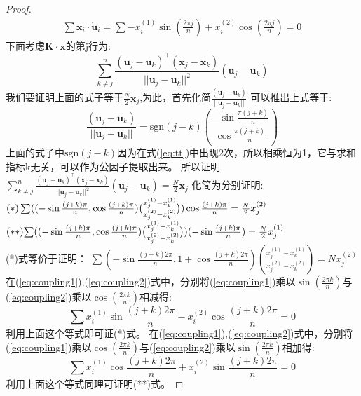 \begin{proof}
\begin{eqnarray}
\sum \bm{x}_i \cdot \mathring{\bm{u}}_i=\sum -x_i^{(1)} \sin(\frac{2\pi j}{n})+x_i^{(2)} \cos(\frac{2\pi j}{n}) =0\label{eq:coupling2}
\end{eqnarray}
下面考虑$\bm{K}\cdot \bm{x}$的第j行为:
\begin{equation}\label{eq:tt}
\sum_{k\neq j}^n \frac{(\bm{u}_j-\bm{u}_k)^\intercal (\bm{x}_j-\bm{x}_k)}{||\bm{u}_j-\bm{u}_k||^2}(\bm{u}_j-\bm{u}_k)
\end{equation}
我们要证明上面的式子等于$\frac{N}{2}\bm{x}_j$,为此，首先化简$\frac{(\bm{u}_j-\bm{u}_k)}{||\bm{u}_j-\bm{u}_k||}$
可以推出上式等于:
\begin{equation}
\frac{(\bm{u}_j-\bm{u}_k)}{||\bm{u}_j-\bm{u}_k||}=\text{sgn}(j-k)\binom{-\sin\frac{\pi(j+k)}{n}}{\cos\frac{\pi(j+k)}{n}}
\end{equation}
上面的式子中$\text{sgn}(j-k)$因为在式(\ref{eq:tt})中出现2次，所以相乘恒为1，它与求和指标k无关，可以作为公因子提取出来。
所以证明
$\sum_{k\neq j}^n \frac{(\bm{u}_j-\bm{u}_k)^\intercal (\bm{x}_j-\bm{x}_k)}{||\bm{u}_j-\bm{u}_k||^2}(\bm{u}_j-\bm{u}_k)=\frac{N}{2}\bm{x}_j
$
化简为分别证明:
$\scriptsize{
(*)\sum ((-\sin\frac{(j+k)\pi}{n},\cos\frac{(j+k)\pi}{n})\binom{x_j^{(1)}-x_k^{(1)}}{x_j^{(2)}-x_k^{(2)}})
\cos\frac{(j+k)\pi}{n}=\frac{N}{2}x_j^{(2)}}$
$(**)\scriptsize{\sum ((-\sin\frac{(j+k)\pi}{n},\cos\frac{(j+k)\pi}{n})\binom{x_j^{(1)}-x_k^{(1)}}{x_j^{(2)}-x_k^{(2)}})
(-\sin\frac{(j+k)\pi}{n})=\frac{N}{2}x_j^{(1)}}$\\
(*)式等价于证明：
$\sum (-\sin\frac{(j+k)2\pi}{n},1+\cos\frac{(j+k)2\pi}{n})\binom{x_j^{(1)}-x_k^{(1)}}{x_j^{(2)}-x_k^{(2)}}=Nx_j^{(2)}
$
在(\ref{eq:coupling1}),(\ref{eq:coupling2})式中，分别将(\ref{eq:coupling1})乘以$\sin(\frac{2\pi k}{n})$与(\ref{eq:coupling2})乘以$\cos(\frac{2\pi k}{n})$相减得:
\begin{equation}
\sum x_i^{(1)}\sin\frac{(j+k)2\pi}{n}-x_i^{(2)}\cos\frac{(j+k)2\pi}{n}=0
\end{equation}
利用上面这个等式即可证(*)式。
在(\ref{eq:coupling1}),(\ref{eq:coupling2})式中，分别将(\ref{eq:coupling1})乘以$\cos(\frac{2\pi k}{n})$与(\ref{eq:coupling2})乘以$\sin(\frac{2\pi k}{n})$相加得:
\begin{equation}
\sum x_i^{(1)}\cos\frac{(j+k)2\pi}{n}+x_i^{(2)}\sin\frac{(j+k)2\pi}{n}=0
\end{equation}
利用上面这个等式同理可证明(**)式。
\end{proof}
